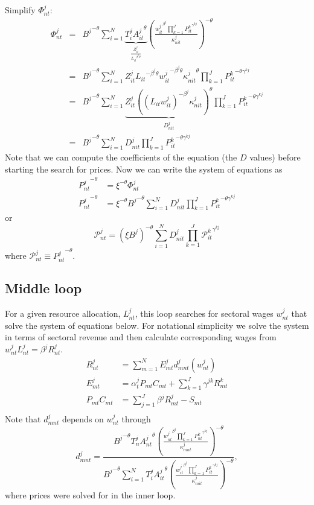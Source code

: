 \documentclass[11pt,oneside,a4paper]{article}
\begin{document}
Simplify $\Phi_{nt}^j:$
\begin{eqnarray*}
  \Phi_{nt}^j &=&  {B^j}^{-\theta} \sum_{i = 1}^N \underbrace{T_i^j {A_{it}^j}^{\theta}}_{\frac{Z_{it}^j}{{L_{it}}^{\beta^j\theta}}} \left(\frac{ {w_{it}^j}^{\beta^j} \prod_{k = 1}^{J}{P_{it}^k}^{\gamma^{kj}}}{\kappa_{nit}^j}\right)^{-\theta}\\
  &=& {B^j}^{-\theta} \sum_{i = 1}^N Z_{it}^j {L_{it}}^{- \beta^j\theta} {w_{it}^j}^{-\beta^j\theta} {\kappa_{nit}^j}^{\theta} \prod_{k = 1}^{J}{P_{it}^k}^{-\theta\gamma^{kj}}\\
  &=& {B^j}^{-\theta} \sum_{i = 1}^N \underbrace{Z_{it}^j {\left((L_{it}w_{it}^j)^{- \beta^j} \kappa_{nit}^j\right)}^{\theta}}_{D_{nit}^j} \prod_{k = 1}^{J}{P_{it}^k}^{-\theta\gamma^{kj}}\\
  &=& {B^j}^{-\theta} \sum_{i = 1}^N D_{nit}^j \prod_{k = 1}^{J}{P_{it}^k}^{-\theta\gamma^{kj}}
\end{eqnarray*}
%
Note that we can compute the coefficients of the equation (the $D$ values) before starting the search for prices.
Now we can write the system of equations as
\begin{align*}
{P_{nt}^j}^{-\theta} &= \xi^{-\theta} {\Phi_{nt}^j}\\ 
%
{P_{nt}^j}^{-\theta} &= \xi^{-\theta} {{B^j}^{-\theta} \sum_{i = 1}^N D_{nit}^j \prod_{k = 1}^{J}{P_{it}^k}^{-\theta\gamma^{kj}}}
\end{align*}
or
$$
\mathcal{P}_{nt}^j = \left(\xi B^j\right)^{-\theta} \sum_{i = 1}^N D_{nit}^j \prod_{k = 1}^{J}{\mathcal{P}_{it}^k}^{\gamma^{kj}} 
$$
where $\mathcal{P}_{nt}^j \equiv {P_{nt}^j}^{-\theta}$.



\newpage
\subsection{Middle loop}
For a given resource allocation, $L_{nt}^j$, this loop searches for sectoral wages $w_{nt}^j$ that solve the system of equations below.
For notational simplicity we solve the system in terms of sectoral revenue and then calculate corresponding wages from $w_{nt}^j L_{nt}^j = \beta^j R_{nt}^j$.
\begin{align*}
R^j_{nt} &= \sum_{m=1}^N E^j_{mt} d^j_{mnt}\!\left(w_{nt}^j\right)  \\
%
E^j_{mt} &= \alpha^j_t P_{mt}C_{mt} + \sum_{k=1}^J \gamma^{jk}R^k_{mt} \\
%
P_{mt}C_{mt} &= \sum_{j=1}^J \beta^j R_{mt}^j - S_{mt} \\
\end{align*}
Note that $d^j_{mnt}$ depends on $w_{nt}^j$ through
$$d_{mnt}^j = \frac{{B^j}^{-\theta} T_n^j {A_{nt}^j}^{\theta} \left(\frac{{w_{nt}^j}^{\beta^j} \prod_{k = 1}^{J}{P_{nt}^k}^{\gamma^{kj}} }{\kappa_{mnt}^j}\right)^{-\theta}}{{B^j}^{-\theta} \sum_{i = 1}^N T_i^j {A_{it}^j}^{\theta} \left(\frac{{w_{it}^j}^{\beta^j} \prod_{k = 1}^{J}{P_{it}^k}^{\gamma^{kj}} }{\kappa_{mit}^j}\right)^{-\theta}},$$
where prices were solved for in the inner loop.
\end{document}

